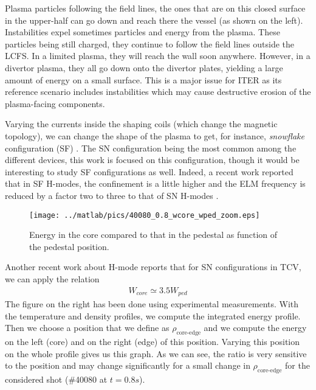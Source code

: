 Plasma particles following the field lines, the ones that are on this closed surface in the upper-half can go down and reach there the vessel (as shown on the left). Instabilities expel sometimes particles and energy from the plasma. These particles being still charged, they continue to follow the field lines outside the LCFS. In a limited plasma, they will reach the wall soon anywhere. However, in a divertor plasma, they all go down onto the divertor plates, yielding a large amount of energy on a small surface. This is a major issue for ITER as its reference scenario includes instabilities which may cause destructive erosion of the plasma-facing components.

Varying the currents inside the shaping coils (which change the magnetic topology), we can change the shape of the plasma to get, for instance, \emph{snowflake} configuration (SF) \cite{francescoPPCF,francescoPRL}. The SN configuration being the most common among the different devices, this work is focused on this configuration, though it would be interesting to study SF configurations as well. Indeed, a recent work reported that in SF H-modes, the confinement is a little higher and the ELM frequency is reduced by a factor two to three to that of SN H-modes \cite{francescoPPCF}.

\begin{wrapfigure}{r}{6cm}
\vspace{-0.5cm}
\texttt{[image: ../matlab/pics/40080\_0.8\_wcore\_wped\_zoom.eps]}
\vspace{-0.5cm}
\caption{\footnotesize Energy in the core compared to that in the pedestal as function of the pedestal position.}
\vspace{-0.5cm}
\end{wrapfigure}
Another recent work about H-mode reports that for SN configurations in TCV, we can apply the relation \cite{andreas2010}
\begin{align}\label{eq:confinement:Hmode:divertor:WcoreWped}
	W_{core} \simeq 3.5 W_{ped}
\end{align}
The figure on the right has been done using experimental measurements. With the temperature and density profiles, we compute the integrated energy profile. Then we choose a position that we define as $\rho_{\textrm{core-edge}}$ and we compute the energy on the left (core) and on the right (edge) of this position. Varying this position on the whole profile gives us this graph. As we can see, the ratio is very sensitive to the position and may change significantly for a small change in $\rho_{\textrm{core-edge}}$ for the considered shot (\#40080 at $t = 0.8s$).
